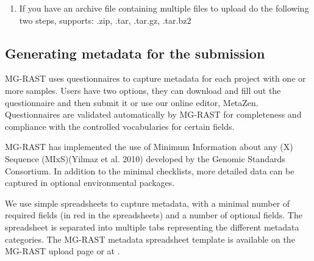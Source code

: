 \documentclass[letterpaper,10pt,english]{sphinxmanual}
\begin{document}
\begin{enumerate}
\item {} 
If you have an archive file containing multiple files to upload do
the following two steps, supports: .zip, .tar, .tar.gz, .tar.bz2

\begin{sphinxVerbatim}[commandchars=\\\{\}]
        
        
\end{sphinxVerbatim}

\end{enumerate}


\subsection{Generating metadata for the submission}
\label{\detokenize{user_manual:generating-metadata-for-the-submission}}\label{\detokenize{user_manual:section-generating-metadata}}
MG-RAST uses questionnaires to capture metadata for each project with
one or more samples. Users have two options, they can download and fill
out the questionnaire and then submit it or use our online editor,
MetaZen. Questionnaires are validated automatically by MG-RAST for
completeness and compliance with the controlled vocabularies for certain
fields.

MG-RAST has implemented the use of Minimum Information about any (X)
Sequence (MIxS)(Yilmaz et al. 2010) developed by the Genomic Standards
Consortium. In addition to the minimal checklists, more detailed data
can be captured in optional environmental packages.

We use simple spreadsheets to capture metadata, with a minimal number of
required fields (in red in the spreadsheets) and a number of optional
fields. The spreadsheet is separated into multiple tabs representing the
different metadata categories. The MG-RAST metadata spreadsheet template
is available on the MG-RAST upload page or at
.
\end{document}
